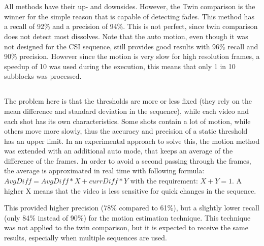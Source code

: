 \section[An answer, with explanation, to the following questions:]{}

\subsection[Can a clear winner be found among all different video shot detection methods and parameter settings?]{}
All methods have their up- and downsides. However, the Twin comparison is the winner for the simple reason that is capable of detecting fades. This method has a recall of 92\% and a precision of 94\%. This is not perfect, since twin comparison does not detect most dissolves. Note that the auto motion, even though it was not designed for the CSI sequence, still provides good results with 96\% recall and 90\% precision. However since the motion is very slow for high resolution frames, a speedup of 10 was used during the execution, this means that only 1 in 10 subblocks was processed.
\\
\subsection[For the clear winner found, or for the video shot detection method that you would use in practice:]{}
\subsubsection[How would you further improve this method in terms of precision?]{}
The problem here is that the thresholds are more or less fixed (they rely on the mean difference and standard deviation in the sequence), while each video and each shot has its own characteristics. Some shots contain a lot of motion, while others move more slowly, thus the accuracy and precision of a static threshold has an upper limit. In an experimental approach to solve this, the motion method was extended with an additional auto mode, that keeps an average of the difference of the frames. In order to avoid a second passing through the frames, the average is approximated in real time with following formula: $AvgDiff = AvgDiff * X + currDiff * Y$ with the requirement: $X+Y = 1$. A higher X means that the video is less sensitive for quick changes in the sequence.

This provided higher precision (78\% compared to 61\%), but a slightly lower recall (only 84\% instead of 90\%) for the motion estimation technique. This technique was not applied to the twin comparison, but it is expected to receive the same results, especially when multiple sequences are used.
\\
